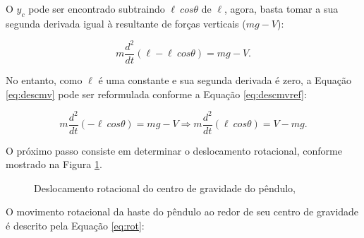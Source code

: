 \documentclass[12pt,           %
a4paper,                       %
openany,                       %
oneside,                       %
chapter=TITLE,                 %
english,                       %
spanish,                       %
brazil,                        %
sumario=tradicional]{abntex2}  %
\begin{document}
\begin{OnehalfSpace}
O $y_c$ pode ser encontrado subtraindo $\ell\:cos\theta$ de $\ell$, agora, basta tomar a sua segunda derivada igual à resultante de forças verticais ($mg-V$):

\begin{equation}
    m\frac{d^2}{dt}(\ell-\ell\:cos\theta) = mg - V.
    \label{eq:descmv}
\end{equation}

No entanto, como $\ell$ é uma constante e sua segunda derivada é zero, a Equação \ref{eq:descmv} pode ser reformulada conforme a Equação \ref{eq:descmvref}:

\begin{equation}
    m\frac{d^2}{dt}(-\ell\:cos\theta) = mg - V \Longrightarrow  m\frac{d^2}{dt}(\ell\:cos\theta) = V-mg.
    \label{eq:descmvref}
\end{equation}

O próximo passo consiste em determinar o deslocamento rotacional, conforme mostrado na Figura \ref{fig:desr}.

\begin{figure}[H]
    \centering
    \vspace*{-0.2cm}
    \caption{Deslocamento rotacional do centro de gravidade do pêndulo,}
    \label{fig:desr}
\end{figure}
\vspace*{-0.9cm}
{\raggedright {}}

O movimento rotacional da haste do pêndulo ao redor de seu centro de gravidade é descrito pela Equação \ref{eq:rot}:


\end{OnehalfSpace}
\end{document}
